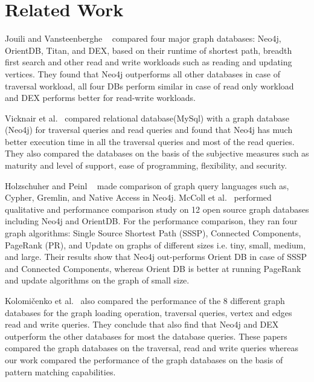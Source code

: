 
\section{Related Work}

Jouili and Vansteenberghe ~\cite{jouili2013empirical} compared four major graph databases: Neo4j, OrientDB, Titan, and DEX, based on their runtime of shortest path, breadth first search and other read and write workloads such as reading and updating vertices. They found that Neo4j outperforms all other databases in case of traversal workload, all four DBs perform similar in case of read only workload and DEX performs better for read-write workloads.

Vicknair et al.~\cite{vicknair2010comparison} compared relational database(MySql) with a graph database (Neo4j) for traversal queries and read queries and found that Neo4j has much better execution time in all the traversal queries and most of the read queries. They also compared the databases on the basis of the subjective measures such as maturity and level of support, ease of programming, flexibility, and security.

Holzschuher and Peinl ~\cite{holzschuher2013performance} made comparison of graph query languages such as, Cypher, Gremlin, and Native Access in Neo4j.  
McColl et al.~\cite{mccoll2014performance} performed qualitative and performance comparison study on 12 open source graph databases including Neo4j and OrientDB. For the performance comparison, they ran four graph algorithms: Single Source Shortest Path (SSSP), Connected Components, PageRank (PR), and Update on graphs of different sizes i.e. tiny, small, medium, and large. Their results show that Neo4j out-performs Orient DB in case of SSSP and Connected Components, whereas Orient DB is better at running PageRank and update algorithms on the graph of small size.

Kolomičenko et al.~\cite{kolomivcenko2013experimental} also compared the performance of the 8 different graph databases for the graph loading operation, traversal queries, vertex and edges read and write queries. They conclude that also find that Neo4j and DEX outperform the other databases for most the database queries. These papers compared the graph databases on the traversal, read and write queries whereas our work compared the performance of the graph databases on the basis of pattern matching capabilities.

